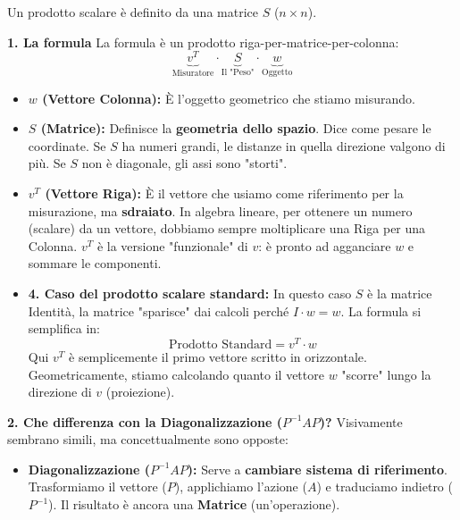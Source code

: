 \documentclass[10pt,a4paper]{article}
\begin{document}
\begin{tcolorbox}[colback=blue!5!white,colframe=blue!75!black,title=\textbf{Riepilogo}]
Un prodotto scalare è definito da una matrice $S$ ($n \times n$).
\vspace{0.3cm}

\begin{tcolorbox}[colback=green!5!white,colframe=green!60!black,title=\textbf{}]

\textbf{1. La formula}
La formula è un prodotto riga-per-matrice-per-colonna:
\[ \underbrace{v^T}_{\text{Misuratore}} \cdot \underbrace{S}_{\text{Il "Peso"}} \cdot \underbrace{w}_{\text{Oggetto}} \]
\begin{itemize}
    \item \textbf{$w$ (Vettore Colonna):} È l'oggetto geometrico che stiamo misurando.
    
    \item \textbf{$S$ (Matrice):} Definisce la \textbf{geometria dello spazio}.
    Dice come pesare le coordinate. Se $S$ ha numeri grandi, le distanze in quella direzione valgono di più. Se $S$ non è diagonale, gli assi sono "storti".
    
    \item \textbf{$v^T$ (Vettore Riga):} È il vettore che usiamo come riferimento per la misurazione, ma \textbf{sdraiato}. 
    In algebra lineare, per ottenere un numero (scalare) da un vettore, dobbiamo sempre moltiplicare una Riga per una Colonna. $v^T$ è la versione "funzionale" di $v$: è pronto ad agganciare $w$ e sommare le componenti.

    \item \textbf{4. Caso del prodotto scalare standard:}
    In questo caso $S$ è la matrice Identità, la matrice "sparisce" dai calcoli perché $I \cdot w = w$.
    La formula si semplifica in:
    \[ \text{Prodotto Standard} = v^T \cdot w \]
    Qui $v^T$ è semplicemente il primo vettore scritto in orizzontale.
    Geometricamente, stiamo calcolando quanto il vettore $w$ "scorre" lungo la direzione di $v$ (proiezione).
\end{itemize}

\textbf{2. Che differenza con la Diagonalizzazione ($P^{-1} A P$)?}
Visivamente sembrano simili, ma concettualmente sono opposte:

\begin{itemize}
    \item \textbf{Diagonalizzazione ($P^{-1} A P$):}
    Serve a \textbf{cambiare sistema di riferimento}.
    Trasformiamo il vettore ($P$), applichiamo l'azione ($A$) e traduciamo indietro ($P^{-1}$). Il risultato è ancora una \textbf{Matrice} (un'operazione).
    

\end{itemize}
\end{tcolorbox}
\end{tcolorbox}
\end{document}
